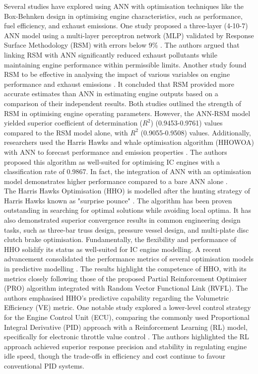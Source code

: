 \documentclass[a4paper, 12pt]{article}
\begin{document}
  Several studies have explored using ANN with optimisation techniques like the Box-Behnken design in optimising engine characteristics, such as performance, fuel efficiency, and exhaust emissions. One study proposed a three-layer (4-10-7) ANN model using a multi-layer perceptron network (MLP) validated by Response Surface Methodology (RSM) with errors below 9\% \parencite{sharmaApplicationMachineLearning2023}. The authors argued that linking RSM with ANN significantly reduced exhaust pollutants while maintaining engine performance within permissible limits. Another study found RSM to be effective in analysing the impact of various variables on engine performance and exhaust emissions \parencite{usluOptimizationDieselEngine2020}. It concluded that RSM provided more accurate estimates than ANN in estimating engine outputs based on a comparison of their independent results. Both studies outlined the strength of RSM in optimising engine operating parameters. However, the ANN-RSM model yielded superior coefficient of determination ($R^2$) (0.9453-0.9761) values compared to the RSM model alone, with $R^2$ (0.9055-0.9508) values. Additionally, researchers used the Harris Hawks and whale optimisation algorithm (HHOWOA) with ANN to forecast performance and emission properties \parencite{singhSampleddataModelValidation2020}. The authors proposed this algorithm as well-suited for optimising IC engines with a classification rate of 0.9867. In fact, the integration of ANN with an optimisation model demonstrates higher performance compared to a bare ANN alone \parencite{gunawanApplicationArtificialNeural2024}. \\


  The Harris Hawks Optimisation (HHO) is modelled after the hunting strategy of Harris Hawks known as "surprise pounce" \parencite{heidariHarrisHawksOptimization2019}. The algorithm has been proven outstanding in searching for optimal solutions while avoiding local optima. It has also demonstrated superior convergence results in common engineering design tasks, such as three-bar truss design, pressure vessel design, and multi-plate disc clutch brake optimisation. Fundamentally, the flexibility and performance of HHO solidify its status as well-suited for IC engine modelling. A recent advancement consolidated the performance metrics of several optimisation models in predictive modelling \parencite{dekaOptimisingNovelMethanol2024}. The results highlight the competence of HHO, with its metrics closely following those of the proposed Partial Reinforcement Optimiser (PRO) algorithm integrated with Random Vector Functional Link (RVFL). The authors emphasised HHO's predictive capability regarding the Volumetric Efficiency (VE) metric. One notable study explored a lower-level control strategy for the Engine Control Unit (ECU), comparing the commonly used Proportional Integral Derivative (PID) approach with a Reinforcement Learning (RL) model, specifically for electronic throttle value control \parencite{omranDeepReinforcementLearning2024}. The authors highlighted the RL approach achieved superior response precision and stability in regulating engine idle speed, though the trade-offs in efficiency and cost continue to favour conventional PID systems.\\
\end{document}
